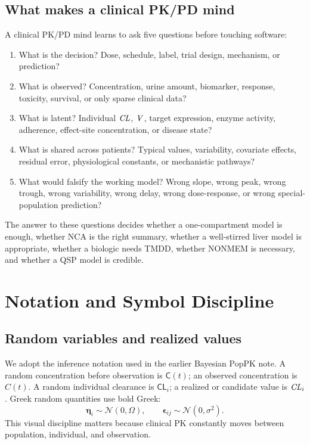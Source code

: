 \documentclass[a4paper]{article}
\newcommand{\Normal}{\mathcal{N}}
\newcommand{\rv}[1]{\mathsf{#1}}
\newcommand{\reta}{\boldsymbol{\eta}}
\newcommand{\repsilon}{\boldsymbol{\epsilon}}
\newcommand{\pkCL}{\pksym{CL}}
\newcommand{\pkV}{\pksym{V}}
\begin{document}
\subsection{What makes a clinical PK/PD mind}

A clinical PK/PD mind learns to ask five questions before touching software:
\begin{enumerate}[leftmargin=2em]
  \item What is the decision? Dose, schedule, label, trial design, mechanism, or prediction?
  \item What is observed? Concentration, urine amount, biomarker, response, toxicity, survival, or only sparse clinical data?
  \item What is latent? Individual \(\pkCL\), \(\pkV\), target expression, enzyme activity, adherence, effect-site concentration, or disease state?
  \item What is shared across patients? Typical values, variability, covariate effects, residual error, physiological constants, or mechanistic pathways?
  \item What would falsify the working model? Wrong slope, wrong peak, wrong trough, wrong variability, wrong delay, wrong dose-response, or wrong special-population prediction?
\end{enumerate}

The answer to these questions decides whether a one-compartment model is enough, whether NCA is the right summary, whether a well-stirred liver model is appropriate, whether a biologic needs TMDD, whether NONMEM is necessary, and whether a QSP model is credible.

\section{Notation and Symbol Discipline}

\subsection{Random variables and realized values}

We adopt the inference notation used in the earlier Bayesian PopPK note. A random concentration before observation is \(\rv{C}(t)\); an observed concentration is \(C(t)\). A random individual clearance is \(\rv{CL}_i\); a realized or candidate value is \(\pkCL_i\). Greek random quantities use bold Greek:
\[
  \reta_i \sim \Normal(0,\Omega),
  \qquad
  \repsilon_{ij}\sim\Normal(0,\sigma^2).
\]
This visual discipline matters because clinical PK constantly moves between population, individual, and observation.
\end{document}
